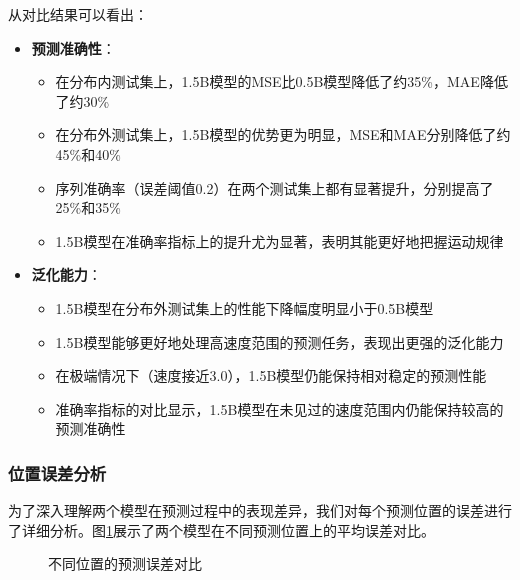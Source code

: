 \documentclass[a4paper, 12pt]{article}
\begin{document}
从对比结果可以看出：

\begin{itemize}
    \item \textbf{预测准确性}：
        \begin{itemize}
            \item 在分布内测试集上，1.5B模型的MSE比0.5B模型降低了约35\%，MAE降低了约30\%
            \item 在分布外测试集上，1.5B模型的优势更为明显，MSE和MAE分别降低了约45\%和40\%
            \item 序列准确率（误差阈值0.2）在两个测试集上都有显著提升，分别提高了25\%和35\%
            \item 1.5B模型在准确率指标上的提升尤为显著，表明其能更好地把握运动规律
        \end{itemize}
    
    \item \textbf{泛化能力}：
        \begin{itemize}
            \item 1.5B模型在分布外测试集上的性能下降幅度明显小于0.5B模型
            \item 1.5B模型能够更好地处理高速度范围的预测任务，表现出更强的泛化能力
            \item 在极端情况下（速度接近3.0），1.5B模型仍能保持相对稳定的预测性能
            \item 准确率指标的对比显示，1.5B模型在未见过的速度范围内仍能保持较高的预测准确性
        \end{itemize}
\end{itemize}

\subsubsection{位置误差分析}
为了深入理解两个模型在预测过程中的表现差异，我们对每个预测位置的误差进行了详细分析。图\ref{fig:position_errors}展示了两个模型在不同预测位置上的平均误差对比。

\begin{figure}[htbp]
    \centering
    \caption{不同位置的预测误差对比}
    \label{fig:position_errors}
\end{figure}
\end{document}
